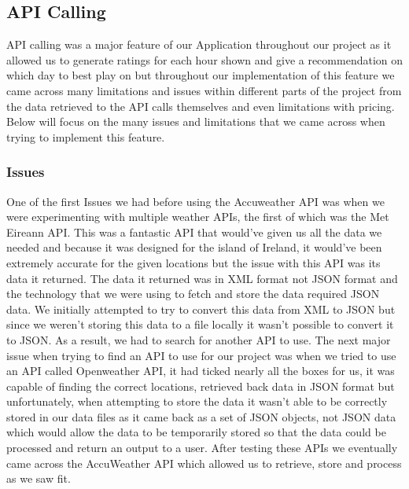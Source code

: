 \subsection{API Calling}
API calling was a major feature of our Application throughout our project as it allowed us to generate ratings for each hour shown and give a recommendation on which day to best play on but throughout our implementation of this feature we came across many limitations and issues within different parts of the project from the data retrieved to the API calls themselves and even limitations with pricing. Below will focus on the many issues and limitations that we came across when trying to implement this feature.

\subsubsection{Issues}
One of the first Issues we had before using the Accuweather API was when we were experimenting with multiple weather APIs, the first of which was the Met Eireann API. This was a fantastic API that would've given us all the data we needed and because it was designed for the island of Ireland, it would've been extremely accurate for the given locations but the issue with this API was its data it returned.
\newline
\newline
The data it returned was in XML format not JSON format and the technology that we were using to fetch and store the data required JSON data. We initially attempted to try to convert this data from XML to JSON but since we weren't storing this data to a file locally it wasn't possible to convert it to JSON. As a result, we had to search for another API to use.
\newline
\newline
The next major issue when trying to find an API to use for our project was when we tried to use an API called Openweather API, it had ticked nearly all the boxes for us, it was capable of finding the correct locations, retrieved back data in JSON format but unfortunately, when attempting to store the data it wasn’t able to be correctly stored in our data files as it came back as a set of JSON objects, not JSON data which would allow the data to be temporarily stored so that the data could be processed and return an output to a user. After testing these APIs we eventually came across the AccuWeather API which allowed us to retrieve, store and process as we saw fit.

